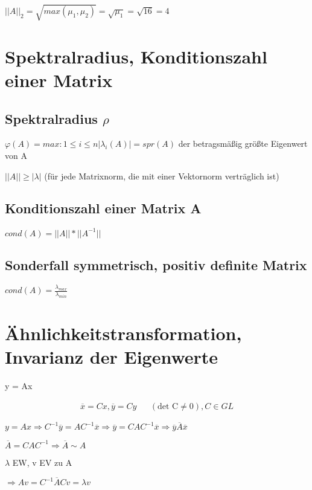 \documentclass[12pt,a4paper]{article} %
\newcommand*\conj[1]{\overline{#1}}
\begin{document}
	$||A||_2 = \sqrt{max(\mu_1, \mu_2)} = \sqrt{\mu_1} = \sqrt{16} = 4$
	
	\newpage
	
	\section{Spektralradius, Konditionszahl einer Matrix}
	
	\subsection{Spektralradius \texorpdfstring{$\rho$}{rho}}
	
	$\varphi(A) = max:{1 \le i \le n} |\lambda_i(A)| = spr(A)$ der betragsmäßig größte Eigenwert von A
	
	$||A|| \ge |\lambda|$ (für jede Matrixnorm, die mit einer Vektornorm verträglich ist)
	
	\subsection{Konditionszahl einer Matrix A}
	
	$cond(A) = ||A||*||A^{-1}||$
	
	\subsection{Sonderfall symmetrisch, positiv definite Matrix}
	
	$cond(A) = \frac{ \lambda_{max}}{ \lambda_{min}}$
	
	\newpage
	
	\section{Ähnlichkeitstransformation, Invarianz der Eigenwerte}
	
	y = Ax
	
	\begin{align*}
		\conj{x} = Cx, \conj{y} = Cy && (\text{det C} \ne 0), C \in GL
	\end{align*}
	
	
	$y = Ax \Rightarrow C^{-1} \conj{y} = AC^{-1} \conj{x} \Rightarrow \conj{y} = CAC^{-1} \conj{x} \Rightarrow \conj{y}\conj{A}\conj{x}$
	
	$\conj{A} = CAC^{-1} \Rightarrow \conj{A} \sim A$
	
	$\lambda$ EW, v EV zu A
	
	$\Rightarrow Av = C^{-1}\conj{A}Cv = \lambda v$
	
\end{document}
